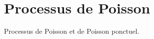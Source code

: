 \section{Processus de Poisson} \label{sec:Proba-Poisson}

Processus de Poisson et de Poisson ponctuel.

